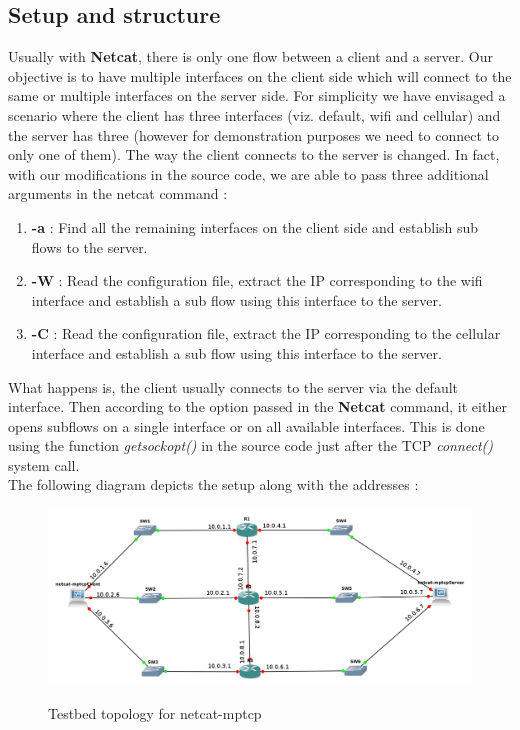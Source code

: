 \documentclass[a4paper,11pt]{article}
\begin{document}
		\subsection{Setup and structure}
			\label{subsec:setup}
			Usually with \textbf{Netcat}, there is only one flow between a client and a server. Our objective is to have multiple interfaces on the client side which will connect to the same or multiple interfaces on the server side. For simplicity we have envisaged a scenario where the client has three interfaces (viz. default, wifi and cellular) and the server has three (however for demonstration purposes we need to connect to only one of them). The way the client connects to the server is changed. In fact, with our modifications in the source code, we are able to pass three additional arguments in the netcat command :

			\begin{enumerate}
				\item \textbf{-a} : Find all the remaining interfaces on the client side and establish sub flows to the server.
				\item \textbf{-W} : Read the configuration file, extract the IP corresponding to the wifi interface and establish a sub flow using this interface to the server.
				\item \textbf{-C} : Read the configuration file, extract the IP corresponding to the cellular interface and establish a sub flow using this interface to the server.
			\end{enumerate}

			What happens is, the client usually connects to the server via the default interface. Then according to the option passed in the \textbf{Netcat} command, it either opens subflows on a single interface or on all available interfaces. This is done using the function \emph{getsockopt()} in the source code just after the TCP \emph{connect()} system call. \\
			The following diagram depicts the setup along with the addresses :
			\begin{figure}[h]
				\begin{center}
					\label{fig:topology}
					\includegraphics[scale=0.45]{pictures/topologie.jpg}
					\caption[]{Testbed topology for netcat-mptcp}
				\end{center}
			\end{figure}
\end{document}
